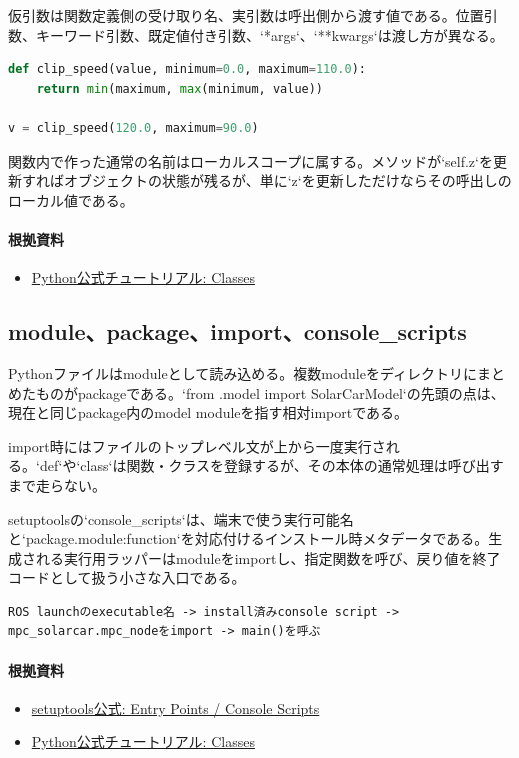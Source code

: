 \documentclass[a4paper,11pt]{article}
\begin{document}
仮引数は関数定義側の受け取り名、実引数は呼出側から渡す値である。位置引数、キーワード引数、既定値付き引数、`*args`、`**kwargs`は渡し方が異なる。


\begin{lstlisting}[language=python]
def clip_speed(value, minimum=0.0, maximum=110.0):
    return min(maximum, max(minimum, value))

v = clip_speed(120.0, maximum=90.0)
\end{lstlisting}


関数内で作った通常の名前はローカルスコープに属する。メソッドが`self.z`を更新すればオブジェクトの状態が残るが、単に`z`を更新しただけならその呼出しのローカル値である。

\paragraph{根拠資料}
\begin{itemize}[leftmargin=1.6em]
\item \href{https://docs.python.org/3/tutorial/classes.html}{Python公式チュートリアル: Classes}
\end{itemize}

\subsection{module、package、import、console\_scripts}
Pythonファイルはmoduleとして読み込める。複数moduleをディレクトリにまとめたものがpackageである。`from .model import SolarCarModel`の先頭の点は、現在と同じpackage内のmodel moduleを指す相対importである。


import時にはファイルのトップレベル文が上から一度実行される。`def`や`class`は関数・クラスを登録するが、その本体の通常処理は呼び出すまで走らない。


setuptoolsの`console\_scripts`は、端末で使う実行可能名と`package.module:function`を対応付けるインストール時メタデータである。生成される実行用ラッパーはmoduleをimportし、指定関数を呼び、戻り値を終了コードとして扱う小さな入口である。


\begin{lstlisting}
ROS launchのexecutable名 -> install済みconsole script -> mpc_solarcar.mpc_nodeをimport -> main()を呼ぶ
\end{lstlisting}

\paragraph{根拠資料}
\begin{itemize}[leftmargin=1.6em]
\item \href{https://setuptools.pypa.io/en/latest/userguide/entry_point.html}{setuptools公式: Entry Points / Console Scripts}
\item \href{https://docs.python.org/3/tutorial/classes.html}{Python公式チュートリアル: Classes}
\end{itemize}
\end{document}
